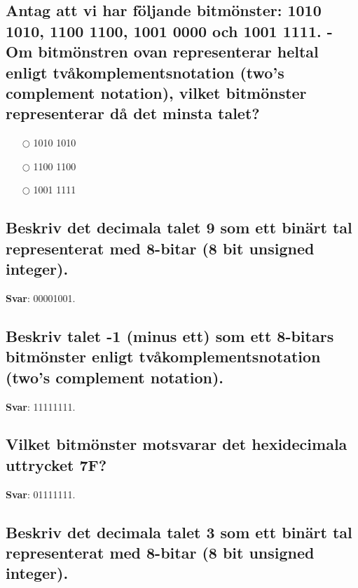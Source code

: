 \documentclass[a4paper,11pt,oneside]{article}
\begin{document}
\begin{sloppypar}
\subsection{Antag att vi har f\"oljande bitm\"onster: 1010 1010, 1100 1100, 1001 0000 och 1001 1111. - Om bitm\"onstren ovan representerar heltal enligt tv\r{a}komplementsnotation (two{\textquoteright}s complement notation), vilket bitm\"onster representerar d\r{a} det minsta talet?}

\label{q:3550001:mc:sv:True}

\begin{itemize}
  \item[$\bigcirc$] 1010 1010
  \item[$\bigcirc$] 1100 1100
  \item[$\bigcirc$] 1001 1111
\end{itemize}





\subsection{Beskriv det decimala talet 9 som ett bin\"art tal representerat med 8-bitar (8 bit unsigned integer).}

\label{q:357:sa:sv:True}

\textbf{Svar}: 00001001.



\subsection{Beskriv talet -1 (minus ett) som ett 8-bitars bitm\"onster enligt tv\r{a}komplementsnotation (two{\textquoteright}s complement notation).}

\label{q:358:sa:sv:True}

\textbf{Svar}: 11111111.



\subsection{Vilket bitm\"onster motsvarar det hexidecimala uttrycket 7F?}

\label{q:359:sa:sv:True}

\textbf{Svar}: 01111111.



\subsection{Beskriv det decimala talet 3 som ett bin\"art tal representerat med 8-bitar (8 bit unsigned integer).}


\end{sloppypar}
\end{document}
